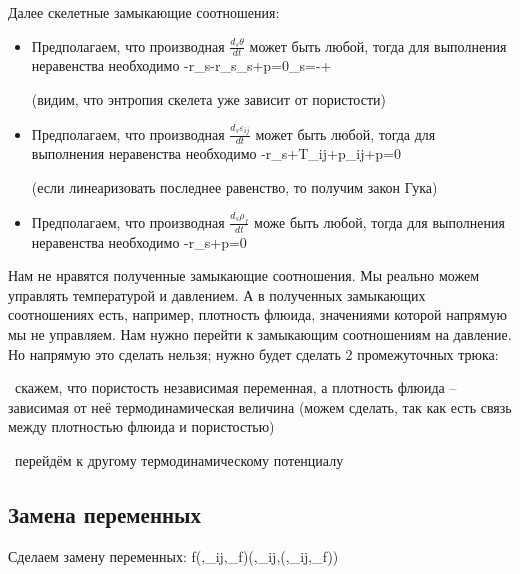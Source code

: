 \documentclass[main.tex]{subfiles}
\begin{document}
Далее скелетные замыкающие соотношения:

\begin{itemize}
\item Предполагаем, что производная $\displaystyle{}\frac{d_s\theta}{dt}$ может быть любой, тогда для выполнения неравенства необходимо 
\beq\label{FirstSkelet1}
-r_s-r_s\eta_s+p\frac{\partial\varphi}{\partial\theta}=0\Rightarrow\eta_s=-+\frac{\partial\varphi}{\partial\theta}
\eeq

(видим, что энтропия скелета уже зависит от пористости)

\item Предполагаем, что производная $\displaystyle{}\frac{d_s\varepsilon_{ij}}{dt}$ может быть любой, тогда для выполнения неравенства необходимо 
\beq\label{FirstSkelet2}
-r_s+T_{ij}+p\varphi\delta_{ij}+p=0
\eeq

(если линеаризовать последнее равенство, то получим закон Гука)

\item Предполагаем, что производная $\displaystyle{}\frac{d_s\rho_f}{dt}$ може быть любой, тогда для выполнения неравенства необходимо 
\beq\label{FirstSkelet3}
-r_s+p=0
\eeq
\end{itemize}

Нам не нравятся полученные замыкающие соотношения. Мы реально можем управлять температурой и давлением. А в полученных замыкающих соотношениях есть, например, плотность флюида, значениями которой напрямую мы не управляем. Нам нужно перейти к замыкающим соотношениям на давление. Но напрямую это сделать нельзя; нужно будет сделать 2 промежуточных трюка:

\textbullet\ скажем, что пористость независимая переменная, а плотность флюида -- зависимая от неё термодинамическая величина (можем сделать, так как есть связь между плотностью флюида и пористостью)

\textbullet\ перейдём к другому термодинамическому потенциалу

\subsection{Замена переменных}

Сделаем замену переменных: 
\beq\label{ChangeVariables}
f\left(\theta,\varepsilon_{ij},\rho_f\right)\rightarrow {}\left(\theta,\varepsilon_{ij},\varphi(\theta,\varepsilon_{ij},\rho_f)\right)
\eeq
\end{document}
